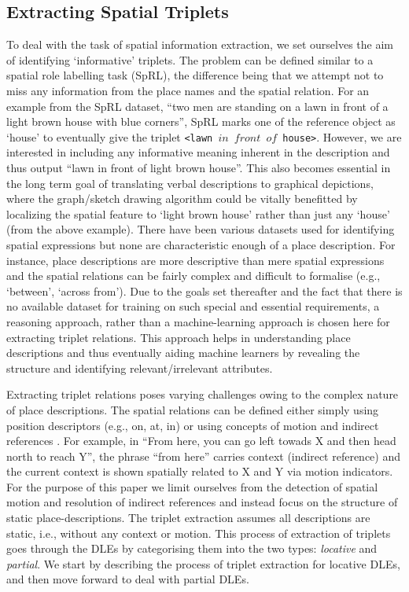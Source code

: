 \documentclass{acm_proc_article-sp}
\begin{document}
\subsection{Extracting Spatial Triplets}
To deal with the task of spatial information extraction, we set ourselves the aim of identifying `informative' triplets. The problem can be defined similar to a spatial role labelling task (SpRL), the difference being that we attempt not to miss any information from the place names and the spatial relation. For an example from the SpRL dataset, ``two men are standing on a lawn in front of a light brown house with blue corners'', SpRL marks one of the reference object as `house' to eventually give the triplet \texttt{<lawn $in$ $front$ $of$  house>}. However, we are interested in including any informative meaning inherent in the description and thus output ``lawn in front of light brown house''. This also becomes essential in the long term goal of translating verbal descriptions to graphical depictions, where the graph/sketch drawing algorithm could be vitally benefitted by localizing the spatial feature to `light brown house' rather than just any `house' (from the above example). There have been various datasets used for identifying spatial expressions \cite{Bateman:data,CLEF:data, parisa:semeval}  but none are characteristic enough of a place description. For instance, place descriptions are more descriptive than mere spatial expressions and the spatial relations can be fairly complex and difficult to formalise (e.g., `between', `across from').  Due to the goals set thereafter and the fact that there is no available dataset for training on such special and essential requirements, a reasoning approach, rather than a machine-learning approach is chosen here for extracting triplet relations. This approach helps in understanding place descriptions and thus eventually aiding machine learners by revealing the structure and identifying relevant/irrelevant attributes.

Extracting triplet relations poses varying challenges owing to the complex nature of place descriptions. The spatial relations can be defined either simply using position descriptors (e.g., on, at, in) or using concepts of motion and indirect references \cite{zlatev:semantics}. For example, in ``From here, you can go left towads X and then head north to reach Y'', the phrase ``from here'' carries context (indirect reference) and the current context is shown spatially related to X and Y via motion indicators. For the purpose of this paper we limit ourselves from the detection of spatial motion and resolution of indirect references and instead focus on the structure of static place-descriptions. The triplet extraction assumes all descriptions are static, i.e., without any context or motion. This process of extraction of triplets goes through the DLEs by categorising them into the two types: \textit{locative} and \textit{partial}. We start by describing the process of triplet extraction for locative DLEs, and then move forward to deal with partial DLEs.
\end{document}
